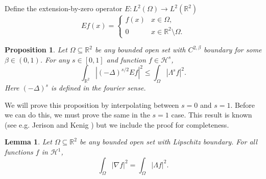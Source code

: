 \documentclass[11pt]{amsart}
\newtheorem{proposition}[theorem]{Proposition}
\newtheorem{lemma}[theorem]{Lemma}
\theoremstyle{remark}
\theoremstyle{definition}
\newcommand{\R}{\mathbb{R}}
\newcommand{\paren}[1]{\left( #1 \right)}
\newcommand{\abs}[1]{\left\lvert #1 \right\rvert}
\newcommand{\grad}{\nabla}
\newcommand{\Laplace}{\Delta}
\newcommand{\HD}{\mathcal{H}}
\begin{document}
Define the extension-by-zero operator $E:L^2(\Omega) \to L^2(\R^2)$
\[ E f (x) = \begin{cases} f(x) & x \in \Omega, \\ 0 & x \in \R^2 \setminus \Omega. \end{cases} \]

\begin{proposition} \label{thm:hadamard 3 lines}
Let $\Omega \subseteq \R^2$ be any bounded open set with $C^{2,\beta}$ boundary for some $\beta \in (0,1)$.  For any $s \in [0,1]$ and function $f \in \HD^s$,
\[ \int_{\R^2} \abs{\paren{-\Laplace}^{s/2} E f}^2 \leq \int_\Omega \abs{\Lambda^s f}^2. \]
Here $\paren{-\Laplace}^s$ is defined in the fourier sense.  
\end{proposition}

We will prove this proposition by interpolating between $s = 0$ and $s=1$.  Before we can do this, we must prove the same in the $s=1$ case.  This result is known (see e.g. Jerison and Kenig \cite{JeKe}) but we include the proof for completeness.  

\begin{lemma} \label{thm:H1 and H1}
Let $\Omega \subseteq \R^2$ be any bounded open set with Lipschitz boundary.  For all functions $f$ in $\HD^1$,
\[ \int_\Omega \abs{\grad f}^2 = \int_\Omega \abs{\Lambda f}^2. \]
\end{lemma}
\end{document}
